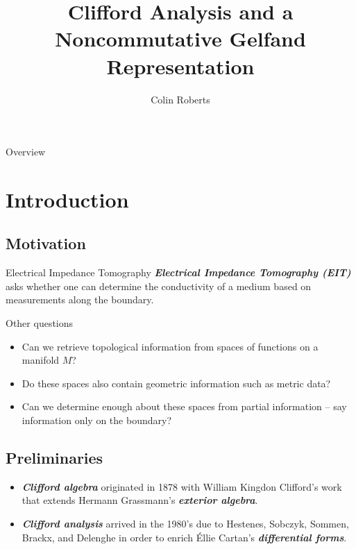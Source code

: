 \documentclass[aspectratio=169,handout]{beamer}
\author{Colin Roberts}
\title{Clifford Analysis and a Noncommutative Gelfand Representation}
\subtitle{}
\newcommand\boldgreen[1]{\textcolor{lighter_csu_green}{\emph{\textbf{#1}}}}
\begin{document}
\begin{frame}{Overview}
\tableofcontents
\end{frame}

\section{Introduction}

\subsection{Motivation}
\begin{frame}{Electrical Impedance Tomography}
\vfill
\boldgreen{Electrical Impedance Tomography (EIT)} asks whether one can determine the conductivity of a medium based on measurements along the boundary.
\vfill
\end{frame}

\begin{frame}{Other questions}
\vfill 
    \begin{itemize}
        \pause 
        \item Can we retrieve topological information from spaces of functions on a manifold $M$?

        \pause
        \item Do these spaces also contain geometric information such as metric data?

        \pause
        \item Can we determine enough about these spaces from partial information -- say information only on the boundary?
    \end{itemize}
\vfill
\end{frame}

\subsection{Preliminaries}

\begin{frame}{}
\vfill
\begin{itemize}
    \item \boldgreen{Clifford algebra} originated in 1878 with William Kingdon Clifford's work that extends Hermann Grassmann's \boldgreen{exterior algebra}.
    \pause
    \item \boldgreen{Clifford analysis} arrived in the 1980's due to Hestenes, Sobczyk, Sommen, Brackx, and Delenghe in order to enrich \'Ellie Cartan's \boldgreen{differential forms}.
\end{itemize}
\vfill
\end{frame}
\end{document}
